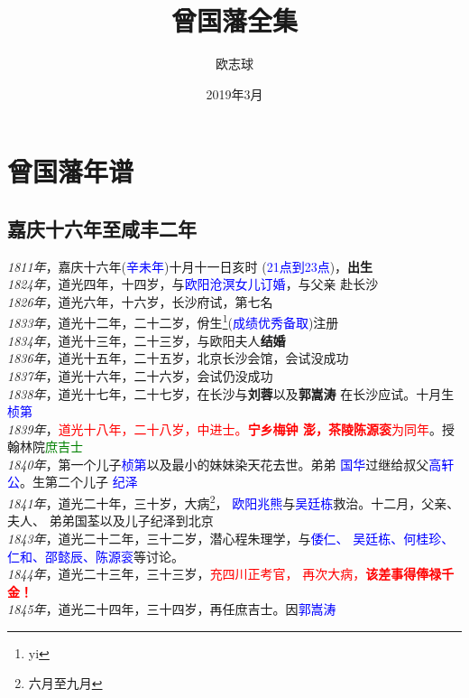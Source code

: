 \documentclass[11pt,a4paper,UTF8]{ctexbook}
\title{曾国藩全集}
\author{欧志球}
\date{2019年3月}
\numberwithin{equation}{chapter}
\begin{document}
	\maketitle
  \chapter{曾国藩年谱}
  \section{嘉庆十六年至咸丰二年}
  \emph{1811年}，嘉庆十六年(\textcolor{blue}{辛未年})十月十一日亥时
  (\textcolor{blue}{21点到23点})，\textbf{出生} \\
   \emph{1824年}，道光四年，十四岁，与\textcolor{blue}{欧阳沧溟女儿订婚}，与父亲
   赴长沙 \\
   \emph{1826年}，道光六年，十六岁，长沙府试，第七名 \\
   \emph{1833年}，道光十二年，二十二岁，佾生\footnote{yi}(\textcolor{blue}{成绩优秀备取})注册 \\
   \emph{1834年}，道光十三年，二十三岁，与欧阳夫人\textbf{结婚} \\
   \emph{1836年}，道光十五年，二十五岁，北京长沙会馆，会试没成功 \\
   \emph{1837年}，道光十六年，二十六岁，会试仍没成功 \\
   \emph{1838年}，道光十七年，二十七岁，在长沙与\textbf{刘蓉}以及\textbf{郭嵩涛}
   在长沙应试。十月生\textcolor{blue}{桢第} \\
   \emph{1839年}，\textcolor{red}{道光十八年，二十八岁，中进士。\textbf{宁乡梅钟
       澎，茶陵陈源衮}为同年}。授翰林院\textcolor{green}{庶吉士} \\
   \emph{1840年}，第一个儿子\textcolor{blue}{桢第}以及最小的妹妹染天花去世。弟弟
   \textcolor{blue}{国华}过继给叔父\textcolor{blue}{高轩公}。生第二个儿子
   \textcolor{blue}{纪泽} \\
   \emph{1841年}，道光二十年，三十岁，大病\footnote{六月至九月}，
   \textcolor{blue}{欧阳兆熊}与\textcolor{blue}{吴廷栋}救治。十二月，父亲、夫人、
   弟弟国荃以及儿子纪泽到北京 \\
   \emph{1843年}，道光二十二年，三十二岁，潜心程朱理学，与\textcolor{blue}{倭仁、
     吴廷栋、何桂珍、仁和、邵懿辰、陈源衮}等讨论。 \\
   \emph{1844年}，道光二十三年，三十三岁，\textcolor{red}{充四川正考官，
     再次大病，\textbf{该差事得俸禄千金！}} \\
   \emph{1845年}，道光二十四年，三十四岁，再任庶吉士。因\textcolor{blue}{郭嵩涛}
\end{document}
